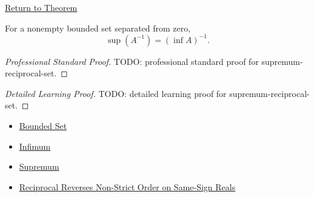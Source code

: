 \newpage
{}
\label{prf:supremum-reciprocal-set}

\begin{remark*}[Return]
\hyperref[thm:supremum-reciprocal-set]{Return to Theorem}
\end{remark*}

\begin{theorem*}
For a nonempty bounded set separated from zero,
\[
  \sup(A^{-1})=(\inf A)^{-1}.
\]
\end{theorem*}

\begin{proof}[Professional Standard Proof]
\LRAProofBodyStart
TODO: professional standard proof for supremum-reciprocal-set.
\end{proof}

\begin{proof}[Detailed Learning Proof]
\LRAProofBodyStart
TODO: detailed learning proof for supremum-reciprocal-set.
\end{proof}

\begin{remark*}
\end{remark*}

\begin{dependencies}
\begin{itemize}
  \item \hyperref[def:bounded]{Bounded Set}
  \item \hyperref[def:infimum]{Infimum}
  \item \hyperref[def:supremum]{Supremum}
  \item \hyperref[thm:reciprocal-reverses-nonstrict-order-on-same-sign-r]{Reciprocal Reverses Non-Strict Order on Same-Sign Reals}
\end{itemize}
\end{dependencies}

\clearpage
